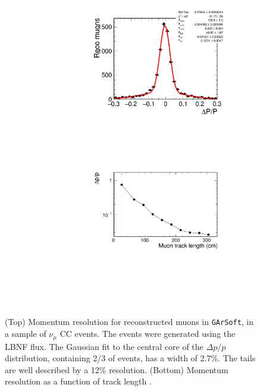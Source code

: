 \begin{figure}[t]
     \centering
     \begin{subfigure}[b]{0.7\textwidth}
         \centering
         \includegraphics[width=\textwidth]{figures/ch3-DUNE/dpmuon.pdf}
         \caption{}
         \label{fig:GArTPCdp}
     \end{subfigure}
     \hfill
     \begin{subfigure}[b]{0.7\textwidth}
         \centering
         \includegraphics[width=\textwidth]{figures/ch3-DUNE/muonpoverpfunc.pdf}
         \caption{}
         \label{fig:GArTPCdpoverp}
     \end{subfigure}
        \caption[Momentum resolution performance of the ND-GAr detector.]{(Top) Momentum resolution for reconstructed muons in \texttt{GArSoft}, in a sample of $\nu_\mu$ CC events. The events were generated using the LBNF flux. The Gaussian fit to the central core of the $\Delta p/p$ distribution, containing 2/3 of events, has a width of 2.7\%. The tails are well described by a 12\% resolution. (Bottom) Momentum resolution as a function of track length \cite{DUNE:2021NDCDR}. }
        \label{fig:GARTPCdp}
\end{figure}

